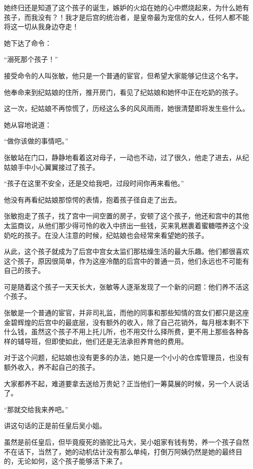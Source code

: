 \begin{multicols}{\theparacolNo}
		她终归还是知道了这个孩子的诞生，嫉妒的火焰在她的心中燃烧起来，为什么她有孩子，而我没有？！我才是后宫的统治者，是皇帝最为宠信的女人，任何人都不能将这一切从我身边夺走！

		她下达了命令：

		“溺死那个孩子！”

		接受命令的人叫张敏，他只是一个普通的宦官，但希望大家能够记住这个名字。

		他奉命来到纪姑娘的住所，推开房门，看见了纪姑娘和她怀中正在吃奶的孩子。

		这一次，纪姑娘不再惊慌了，历经这么多的风风雨雨，她很清楚即将发生些什么。

		她从容地说道：

		“做你该做的事情吧。”

		张敏站在门口，静静地看着这对母子，一动也不动，过了很久，他走了进去，从纪姑娘手中小心翼翼接过了孩子。

		“孩子在这里不安全，还是交给我吧，过段时间你再来看他。”

		他没有再看纪姑娘那惊愕的表情，抱着孩子径自走了出去。

		张敏抱走了孩子，找了宫中一间空置的房子，安顿了这个孩子，他还和宫中的其他太监商议，从他们那少得可怜的收入中挤出一些钱，买来乳糕裹着蜜糖喂养这个没奶吃的孩子。在没人注意的时候，纪姑娘也会经常来看望她的孩子。

		从此，这个孩子就成为了后宫中宫女太监们那枯燥生活的最大乐趣。他们都很喜欢这个孩子，原因很简单，作为这座冷酷的后宫中的普通一员，他们永远也不可能有自己的孩子。

		可是随着这个孩子一天天长大，张敏等人逐渐发现了一个新的问题：他们养不活这个孩子。

		张敏是一个普通的宦官，并非司礼监，而他的同事和那些知情的宫女们都只是这座金碧辉煌的后宫中的最底层，没有额外的收入，除了自己花销外，每月根本剩不下什么钱，虽然这个孩子不用上托儿所，也不用交什么择所费，更不用上那些各种各样的辅导班，但即使如此，他们还是无法承担养育他的费用。

		对于这个问题，纪姑娘也没有更多的办法，她只是一个小小的仓库管理员，也没有额外收入，养不起自己的孩子。

		大家都养不起，难道要拿去送给万贵妃？正当他们一筹莫展的时候，另一个人说话了。

		“那就交给我来养吧。”

		讲这句话的正是前任皇后吴小姐。

		虽然是前任皇后，但毕竟瘦死的骆驼比马大，吴小姐家有钱有势，养一个孩子自然不在话下，当然了，她的动机估计没有那么单纯，打倒万阿姨仍然是她的最终目的，无论如何，这个孩子能够活下来了。


\end{multicols}
